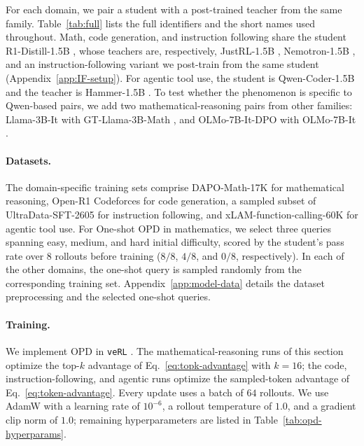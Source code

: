 For each domain, we pair a student with a post-trained teacher from the same family. Table~\ref{tab:full} lists the full identifiers and the short names used throughout. Math, code generation, and instruction following share the student R1-Distill-1.5B \citep{deepseekai2025deepseekr1incentivizingreasoningcapability}, whose teachers are, respectively, JustRL-1.5B \citep{he2025justrl}, Nemotron-1.5B \citep{zeng2025rlve}, and an instruction-following variant we post-train from the same student (Appendix~\ref{app:IF-setup}). For agentic tool use, the student is Qwen-Coder-1.5B \citep{hui2024qwen2} and the teacher is Hammer-1.5B \citep{lin2024hammer}. To test whether the phenomenon is specific to Qwen-based pairs, we add two mathematical-reasoning pairs from other families: Llama-3B-It \citep{grattafiori2024llama} with GT-Llama-3B-Math \citep{zhang2025co}, and OLMo-7B-It-DPO with OLMo-7B-It \citep{olmo2025olmo}.

\paragraph{Datasets.}
The domain-specific training sets comprise DAPO-Math-17K \citep{yu2026dapo} for mathematical reasoning, Open-R1 Codeforces \citep{penedo2025codeforces} for code generation, a sampled subset of UltraData-SFT-2605 \citep{ultradata-sft-2605} for instruction following, and xLAM-function-calling-60K \citep{liu2024apigen} for agentic tool use. For One-shot OPD in mathematics, we select three queries spanning easy, medium, and hard initial difficulty, scored by the student's pass rate over 8 rollouts before training (\(8/8\), \(4/8\), and \(0/8\), respectively). In each of the other domains, the one-shot query is sampled randomly from the corresponding training set. Appendix~\ref{app:model-data} details the dataset preprocessing and the selected one-shot queries.

\paragraph{Training.}
We implement OPD in \texttt{veRL} \citep{sheng2025hybridflow}.
The mathematical-reasoning runs of this section optimize the top-\(k\) advantage of Eq.~\ref{eq:topk-advantage} with \(k=16\); the code, instruction-following, and agentic runs optimize the sampled-token advantage of Eq.~\ref{eq:token-advantage}.
Every update uses a batch of $64$ rollouts. We use AdamW with a learning rate of $10^{-6}$, a rollout temperature of $1.0$, and a gradient clip norm of $1.0$; remaining hyperparameters are listed in Table~\ref{tab:opd-hyperparams}.


